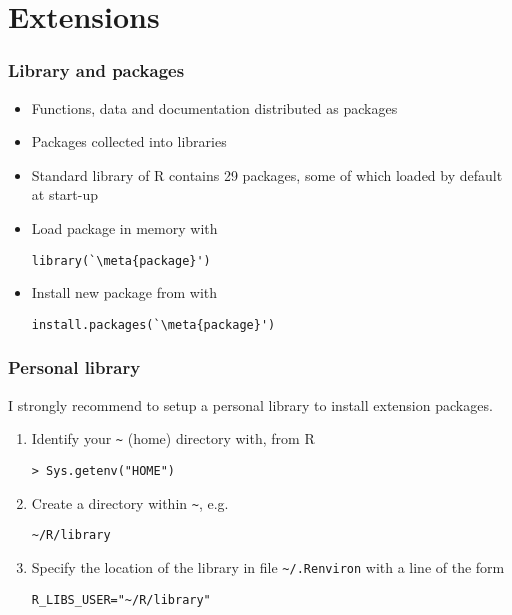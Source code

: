 \section{Extensions}

\begin{frame}[fragile=singleslide]
  \frametitle{Library and packages}

  \begin{itemize}
  \item Functions, data and documentation distributed as \alert{packages}
  \item Packages collected into \alert{libraries}
  \item Standard library of R contains 29 packages, some of which
    loaded by default at start-up
  \item Load package in memory with
    \begin{Schunk}
\begin{lstlisting}
library(`\meta{package}')
\end{lstlisting}
    \end{Schunk}
  \item Install new package from
     with
    \begin{Schunk}
\begin{lstlisting}
install.packages(`\meta{package}')
\end{lstlisting}
    \end{Schunk}
  \end{itemize}
\end{frame}

\begin{frame}[fragile=singleslide]
  \frametitle{Personal library}

  I strongly recommend to setup a personal library to install
  extension packages.

  \begin{enumerate}
  \item Identify your \verb=~= (\alert{home}) directory with, from R
    \begin{Schunk}
\begin{lstlisting}
> Sys.getenv("HOME")
\end{lstlisting}
    \end{Schunk}
  \item Create a directory within \verb=~=, e.g.
    \begin{Schunk}
\begin{lstlisting}
~/R/library
\end{lstlisting}
    \end{Schunk}
  \item Specify the location of the library in file
    \verb=~/.Renviron= with a line of the form
    \begin{Schunk}
\begin{lstlisting}
R_LIBS_USER="~/R/library"
\end{lstlisting}
    \end{Schunk}
  \end{enumerate}
\end{frame}

